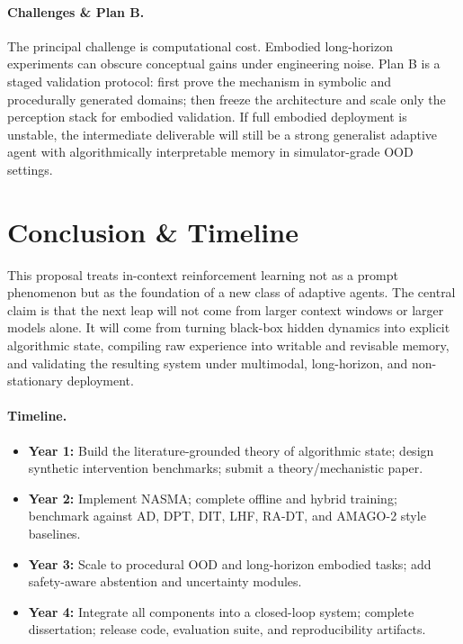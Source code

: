 \documentclass[10pt,twocolumn,letterpaper]{article}
\begin{document}
\paragraph{Challenges \& Plan B.}
The principal challenge is computational cost. Embodied long-horizon experiments can obscure conceptual gains under engineering noise. Plan B is a staged validation protocol: first prove the mechanism in symbolic and procedurally generated domains; then freeze the architecture and scale only the perception stack for embodied validation. If full embodied deployment is unstable, the intermediate deliverable will still be a strong generalist adaptive agent with algorithmically interpretable memory in simulator-grade OOD settings.

\section{Conclusion \& Timeline}
This proposal treats in-context reinforcement learning not as a prompt phenomenon but as the foundation of a new class of adaptive agents. The central claim is that the next leap will not come from larger context windows or larger models alone. It will come from turning black-box hidden dynamics into explicit algorithmic state, compiling raw experience into writable and revisable memory, and validating the resulting system under multimodal, long-horizon, and non-stationary deployment.

\paragraph{Timeline.}
\begin{itemize}[leftmargin=1.2em]
\item \textbf{Year 1:} Build the literature-grounded theory of algorithmic state; design synthetic intervention benchmarks; submit a theory/mechanistic paper.
\item \textbf{Year 2:} Implement NASMA; complete offline and hybrid training; benchmark against AD, DPT, DIT, LHF, RA-DT, and AMAGO-2 style baselines.
\item \textbf{Year 3:} Scale to procedural OOD and long-horizon embodied tasks; add safety-aware abstention and uncertainty modules.
\item \textbf{Year 4:} Integrate all components into a closed-loop system; complete dissertation; release code, evaluation suite, and reproducibility artifacts.
\end{itemize}



\end{document}
